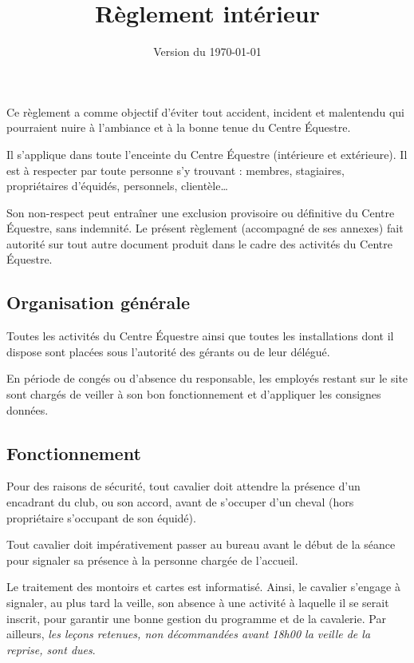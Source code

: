 \documentclass[11pt,a4paper]{article}
\title[Règlement intérieur -- version du \today]{Règlement intérieur}
\subtitle{Version du \today}
\author{}
\date{}
\begin{document}
   \mainHeader{}
   \maketitle


   Ce règlement a comme objectif d'éviter tout accident, incident et malentendu qui pourraient nuire à l'ambiance et à la bonne tenue du Centre Équestre.

   Il s'applique dans toute l'enceinte du Centre Équestre (intérieure et extérieure).
   Il est à respecter par toute personne s'y trouvant : membres, stagiaires, propriétaires d'équidés, personnels, clientèle\dots

   Son non-respect peut entraîner une exclusion provisoire ou définitive du Centre Équestre, sans indemnité.
   Le présent règlement (accompagné de ses annexes) fait autorité sur tout autre document produit dans le cadre des activités du Centre Équestre.

   \subsection{Organisation générale}\label{subsec:organisation-generale}
   Toutes les activités du Centre Équestre ainsi que toutes les installations dont il dispose sont placées sous l'autorité des gérants ou de leur délégué.

   En période de congés ou d'absence du responsable, les employés restant sur le site sont chargés de veiller à son bon fonctionnement et d'appliquer les consignes données.

   \subsection{Fonctionnement}\label{subsec:fonctionnement}
   Pour des raisons de sécurité, tout cavalier doit attendre la présence d'un encadrant du club, ou son accord, avant de s'occuper d'un cheval (hors propriétaire s'occupant de son équidé).

   Tout cavalier doit impérativement passer au bureau avant le début de la séance pour signaler sa présence à la personne chargée de l'accueil.

   Le traitement des montoirs et cartes est informatisé.
   Ainsi, le cavalier s'engage à signaler, au plus tard la veille, son absence à une activité à laquelle il se serait inscrit, pour garantir une bonne gestion du programme et de la cavalerie.
   Par ailleurs, \emph{les leçons retenues, non décommandées avant 18h00 la veille de la reprise, sont dues}.
\end{document}
